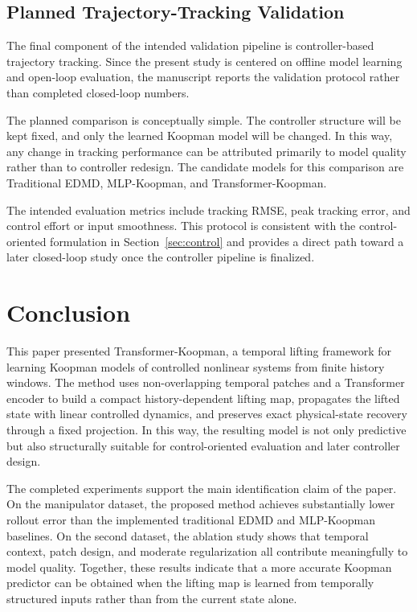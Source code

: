 \documentclass[journal]{IEEEtran}
\begin{document}
\subsection{Planned Trajectory-Tracking Validation}

The final component of the intended validation pipeline is controller-based trajectory tracking. Since the present study is centered on offline model learning and open-loop evaluation, the manuscript reports the validation protocol rather than completed closed-loop numbers.

The planned comparison is conceptually simple. The controller structure will be kept fixed, and only the learned Koopman model will be changed. In this way, any change in tracking performance can be attributed primarily to model quality rather than to controller redesign. The candidate models for this comparison are Traditional EDMD, MLP-Koopman, and Transformer-Koopman.

The intended evaluation metrics include tracking RMSE, peak tracking error, and control effort or input smoothness. This protocol is consistent with the control-oriented formulation in Section~\ref{sec:control} and provides a direct path toward a later closed-loop study once the controller pipeline is finalized.

\section{Conclusion}
\label{sec:conclusion}

This paper presented Transformer-Koopman, a temporal lifting framework for learning Koopman models of controlled nonlinear systems from finite history windows. The method uses non-overlapping temporal patches and a Transformer encoder to build a compact history-dependent lifting map, propagates the lifted state with linear controlled dynamics, and preserves exact physical-state recovery through a fixed projection. In this way, the resulting model is not only predictive but also structurally suitable for control-oriented evaluation and later controller design.

The completed experiments support the main identification claim of the paper. On the manipulator dataset, the proposed method achieves substantially lower rollout error than the implemented traditional EDMD and MLP-Koopman baselines. On the second dataset, the ablation study shows that temporal context, patch design, and moderate regularization all contribute meaningfully to model quality. Together, these results indicate that a more accurate Koopman predictor can be obtained when the lifting map is learned from temporally structured inputs rather than from the current state alone.
\end{document}
